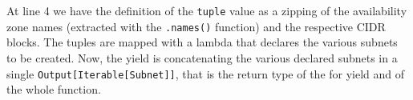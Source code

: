 At line 4 we have the definition of the \texttt{tuple} value as a zipping of the availability zone names (extracted with the \texttt{.names()} function) and the respective CIDR blocks.
The tuples are mapped with a lambda that declares the various subnets to be created.
Now, the yield is concatenating the various declared subnets in a single \texttt{Output[Iterable[Subnet]]}, that is the return type of the for yield and of the whole function.\\



